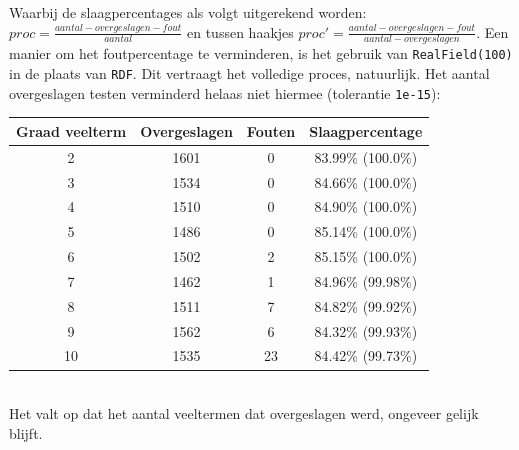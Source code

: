 \documentclass{article}
\begin{document}
Waarbij de slaagpercentages als volgt uitgerekend worden: \(proc = \frac{aantal - overgeslagen - fout}{aantal}\) en tussen haakjes \(proc' = \frac{aantal - overgeslagen - fout}{aantal - overgeslagen}\). Een manier om het foutpercentage te verminderen, is het gebruik van \verb|RealField(100)| in de plaats van \verb|RDF|. Dit vertraagt het volledige proces, natuurlijk. Het aantal overgeslagen testen verminderd helaas niet hiermee (tolerantie \verb|1e-15|):\\
\begin{tabular}{|c|c|c|c|}
 \hline
 \textbf{Graad veelterm} & \textbf{Overgeslagen} & \textbf{Fouten} & \textbf{Slaagpercentage} \\
 \hline
 2  & 1601 & 0   & 83.99\% (100.0\%) \\
 3  & 1534 & 0   & 84.66\% (100.0\%) \\
 4  & 1510 & 0   & 84.90\% (100.0\%) \\
 5  & 1486 & 0   & 85.14\% (100.0\%) \\
 6  & 1502 & 2   & 85.15\% (100.0\%) \\
 7  & 1462 & 1   & 84.96\% (99.98\%) \\
 8  & 1511 & 7   & 84.82\% (99.92\%) \\
 9  & 1562 & 6   & 84.32\% (99.93\%) \\
 10 & 1535 & 23  & 84.42\% (99.73\%) \\
 \hline
\end{tabular} \\
Het valt op dat het aantal veeltermen dat overgeslagen werd, ongeveer gelijk blijft.
\end{document}

